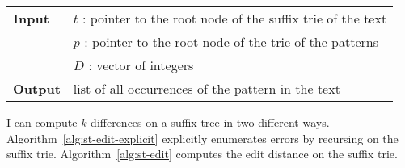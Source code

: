 \begin{center}
\begin{minipage}[t]{.8\textwidth}
\begin{algorithm}[H]
\begin{tabular}{ll}
\textbf{Input}  & $t$ : pointer to the root node of the suffix trie of the text\\
 			    & $p$ : pointer to the root node of the trie of the patterns\\
 			    & $D$ : vector of integers\\
\textbf{Output} & list of all occurrences of the pattern in the text\\
\end{tabular}
\begin{algorithmic}[1]
	\State \Report {}
		\Repeat
			\State {}
	\EndIf
\EndIf
\end{algorithmic}
\label{alg:st-edit}
\end{algorithm}
\end{minipage}
\end{center}

I can compute $k$-differences on a suffix tree in two different ways. Algorithm~\ref{alg:st-edit-explicit} explicitly enumerates errors by recursing on the suffix trie. Algorithm~\ref{alg:st-edit} computes the edit distance on the suffix trie.

%

